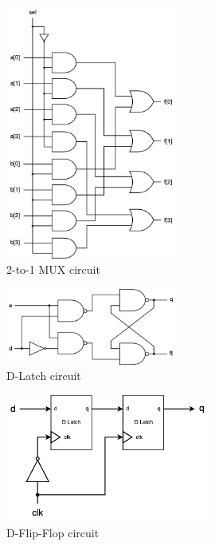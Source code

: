 \documentclass[10.5pt,compsoc,UTF8]{CjC}
\theoremstyle{mystyle}
\begin{document}
\begin{figure}[h]
    \centering
    \includegraphics[width=0.5\textwidth]{2-to-1 MUX.png}
      \caption{2-to-1 MUX circuit}
    \label{fig:1-to-2-MUX}
\end{figure}

\newpage

\begin{figure}[h]
    \centering
    \includegraphics[width=0.5\textwidth]{D_Latch.png}
      \caption{D-Latch circuit}
    \label{fig:D-Latch}
\end{figure}

\begin{figure}[h]
    \centering
    \includegraphics[width=0.6\textwidth]{D_Flip_Flop.png}
      \caption{D-Flip-Flop circuit}
    \label{fig:D-Flip-Flop}
\end{figure}
\end{document}
